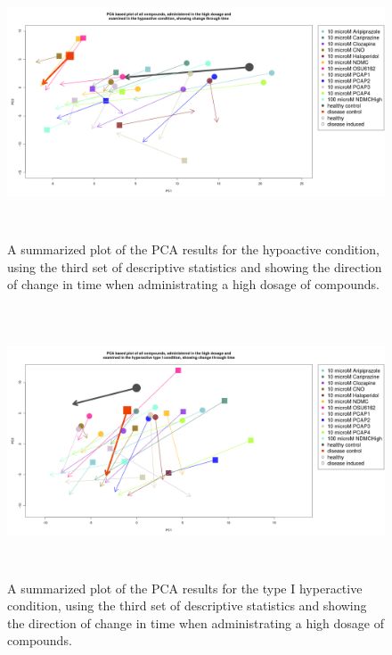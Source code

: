 \documentclass[a4paper,12pt]{article}
\begin{document}
\newpage
\begin{figure}[h!]
\begin{center}
\includegraphics[width=16cm,height=8cm]{All_together_10_microM_DarkApoLow_in_time_set3.png}
\caption{A summarized plot of the PCA results for the hypoactive condition, using the third set of descriptive statistics and showing the direction of change in time when administrating a high dosage of compounds.}
\end{center}
\end{figure}
\newpage
\begin{figure}[h!]
\begin{center}
\includegraphics[width=16cm,height=8cm]{All_together_10_microM_DarkApoHigh_in_time_set3.png}
\caption{A summarized plot of the PCA results for the type I hyperactive condition, using the third set of descriptive statistics and showing the direction of change in time when administrating a high dosage of compounds.}
\end{center}
\end{figure}
\end{document}

